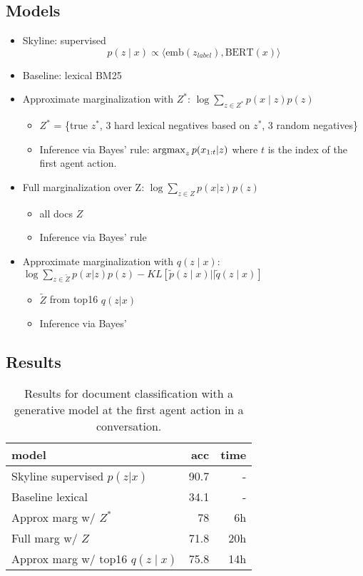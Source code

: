\documentclass[11pt]{article}
\begin{document}
\subsection{Models}
\begin{itemize}
\item Skyline: supervised $$p(z \mid x) \propto \langle \text{emb}(z_{label}), \text{BERT}(x)\rangle$$
\item Baseline: lexical BM25
\item Approximate marginalization with $Z^*$: $\log\sum_{z\in Z^*} p(x\mid z) p(z)$
    \begin{itemize}
    \item $Z^*$ = \{true $z^*$, 3 hard lexical negatives based on $z^*$, 3 random negatives\}
    \item Inference via Bayes' rule: $\operatorname*{argmax}_z p(x_{1:t}|z)$ where $t$ is the index
        of the first agent action.
    \end{itemize}
\item Full marginalization over Z: $\log\sum_{z\in Z} p(x|z)p(z)$
    \begin{itemize}
    \item all docs $Z$
    \item Inference via Bayes' rule
    \end{itemize}
\item Approximate marginalization with $q(z\mid x)$:
    $\log\sum_{z\in \tilde{Z}} p(x|z)p(z) - KL[\tilde{p}(z\mid x)||\tilde{q}(z\mid x)]$
    \begin{itemize}
    \item $\tilde{Z}$ from top16 $q(z|x)$
    \item Inference via Bayes'
    \end{itemize}
\end{itemize}

\subsection{Results}

\begin{table}
\centering
\begin{tabular}{lrr}
\toprule
model & acc & time\\
\midrule
Skyline supervised $p(z|x)$ & 90.7 & -\\
Baseline lexical & 34.1 & -\\
Approx marg w/ $Z^*$ & 78 & 6h\\
Full marg w/ $Z$ & 71.8 & 20h\\
Approx marg w/ top16 $q(z\mid x)$ & 75.8 & 14h\\
\bottomrule
\end{tabular}
\caption{
\label{tbl:unsup-doc-app}
Results for document classification with a generative model at the first
agent action in a conversation.}
\end{table}
\end{document}
